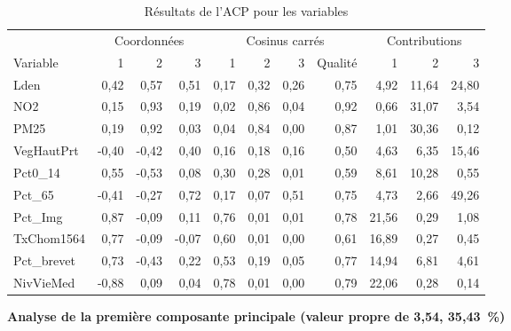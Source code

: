 \documentclass[
  11pt,
  french,
]{book}
\begin{document}
\begin{table}

\caption{\label{tab:dataacpCoordVars}Résultats de l'ACP pour les variables}
\centering
\fontsize{8}{10}\selectfont
\begin{tabular}[t]{lrrrrrrrrrr}
\toprule
\multicolumn{1}{c}{ } & \multicolumn{3}{c}{Coordonnées} & \multicolumn{4}{c}{Cosinus carrés} & \multicolumn{3}{c}{Contributions} \\
\cmidrule(l{3pt}r{3pt}){2-4} \cmidrule(l{3pt}r{3pt}){5-8} \cmidrule(l{3pt}r{3pt}){9-11}
Variable & 1 & 2 & 3 & 1 & 2 & 3 & Qualité & 1 & 2 & 3\\
\midrule
Lden & 0,42 & 0,57 & 0,51 & 0,17 & 0,32 & 0,26 & 0,75 & 4,92 & 11,64 & 24,80\\
NO2 & 0,15 & 0,93 & 0,19 & 0,02 & 0,86 & 0,04 & 0,92 & 0,66 & 31,07 & 3,54\\
PM25 & 0,19 & 0,92 & 0,03 & 0,04 & 0,84 & 0,00 & 0,87 & 1,01 & 30,36 & 0,12\\
VegHautPrt & -0,40 & -0,42 & 0,40 & 0,16 & 0,18 & 0,16 & 0,50 & 4,63 & 6,35 & 15,46\\
Pct0\_14 & 0,55 & -0,53 & 0,08 & 0,30 & 0,28 & 0,01 & 0,59 & 8,61 & 10,28 & 0,55\\
\addlinespace
Pct\_65 & -0,41 & -0,27 & 0,72 & 0,17 & 0,07 & 0,51 & 0,75 & 4,73 & 2,66 & 49,26\\
Pct\_Img & 0,87 & -0,09 & 0,11 & 0,76 & 0,01 & 0,01 & 0,78 & 21,56 & 0,29 & 1,08\\
TxChom1564 & 0,77 & -0,09 & -0,07 & 0,60 & 0,01 & 0,00 & 0,61 & 16,89 & 0,27 & 0,45\\
Pct\_brevet & 0,73 & -0,43 & 0,22 & 0,53 & 0,19 & 0,05 & 0,77 & 14,94 & 6,81 & 4,61\\
NivVieMed & -0,88 & 0,09 & 0,04 & 0,78 & 0,01 & 0,00 & 0,79 & 22,06 & 0,28 & 0,14\\
\bottomrule
\end{tabular}
\end{table}

\textbf{Analyse de la première composante principale (valeur propre de 3,54, 35,43~\%)}
\end{document}
